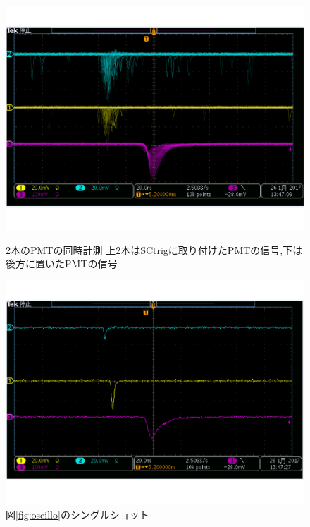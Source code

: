 \begin{figure}[H]
\begin{minipage}{0.5\hsize}
\centering
\includegraphics[keepaspectratio,scale=0.3]{fig/ybm/oscillo.pdf}
\caption{2本のPMTの同時計測\newline
上2本はSCtrigに取り付けたPMTの信号,下は後方に置いたPMTの信号}
\label{fig:oscillo}
\end{minipage}
\begin{minipage}{0.5\hsize}
\centering
\includegraphics[keepaspectratio,scale=0.3]{fig/ybm/oscillo1.pdf}
\caption{図\ref{fig:oscillo}のシングルショット}
\label{fig:oscillo1}
\end{minipage}
\end{figure}

